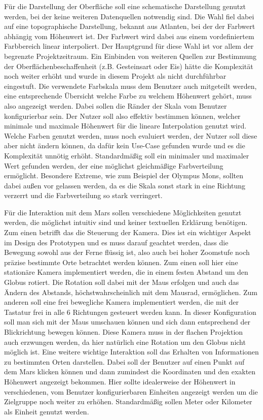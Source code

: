 Für die Darstellung der Oberfläche soll eine schematische Darstellung genutzt werden, bei der keine weiteren Datenquellen notwendig sind. Die Wahl fiel dabei auf eine topographische Darstellung, bekannt aus Atlanten, bei der der Farbwert abhängig vom Höhenwert ist. Der Farbwert wird dabei aus einem vordefiniertem Farbbereich linear interpoliert. Der Hauptgrund für diese Wahl ist vor allem der begrenzte Projektzeitraum. Ein Einbinden von weiteren Quellen zur Bestimmung der Oberflächenbeschaffenheit (z.B. Gesteinsart oder Eis) hätte die Komplexität noch weiter erhöht und wurde in diesem Projekt als nicht durchführbar eingestuft. Die verwendete Farbskala muss dem Benutzer auch mitgeteilt werden, eine entsprechende Übersicht welche Farbe zu welchem Höhenwert gehört, muss also angezeigt werden. Dabei sollen die Ränder der Skala vom Benutzer konfigurierbar sein. Der Nutzer soll also effektiv bestimmen können, welcher minimale und maximale Höhenwert für die lineare Interpolation genutzt wird. Welche Farben genutzt werden, muss noch evaluiert werden, der Nutzer soll diese aber nicht ändern können, da dafür kein Use-Case gefunden wurde und es die Komplexität unnötig erhöht. Standardmäßig soll ein minimaler und maximaler Wert gefunden werden, der eine möglichst gleichmäßige Farbverteilung ermöglicht. Besondere Extreme, wie zum Beispiel der Olympus Mons, sollten dabei außen vor gelassen werden, da es die Skala sonst stark in eine Richtung verzerrt und die Farbverteilung so stark verringert.

Für die Interaktion mit dem Mars sollen verschiedene Möglichkeiten genutzt werden, die möglichst intuitiv sind und keiner textuellen Erklärung benötigen. Zum einen betrifft das die Steuerung der Kamera. Dies ist ein wichtiger Aspekt im Design des Prototypen und es muss darauf geachtet werden, dass die Bewegung sowohl aus der Ferne flüssig ist, also auch bei hoher Zoomstufe noch präzise bestimmte Orte betrachtet werden können. Zum einen soll hier eine stationäre Kamera implementiert werden, die in einem festen Abstand um den Globus rotiert. Die Rotation soll dabei mit der Maus erfolgen und auch das Ändern des Abstands, höchstwahrscheinlich mit dem Mausrad, ermöglichen. Zum anderen soll eine frei bewegliche Kamera implementiert werden, die mit der Tastatur frei in alle 6 Richtungen gesteuert werden kann. In dieser Konfiguration soll man sich mit der Maus umschauen können und sich dann entsprechend der Blickrichtung bewegen können. Diese Kamera muss in der flachen Projektion auch erzwungen werden, da hier natürlich eine Rotation um den Globus nicht möglich ist. Eine weitere wichtige Interaktion soll das Erhalten von Informationen zu bestimmten Orten darstellen. Dabei soll der Benutzer auf einen Punkt auf dem Mars klicken können und dann zumindest die Koordinaten und den exakten Höhenwert angezeigt bekommen. Hier sollte idealerweise der Höhenwert in verschiedenen, vom Benutzer konfigurierbaren Einheiten angezeigt werden um die Zielgruppe noch weiter zu erhöhen. Standardmäßig sollen Meter oder Kilometer als Einheit genutzt werden.

